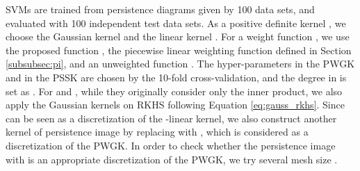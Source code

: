 \documentclass{article}
\begin{document}
SVMs are trained from persistence diagrams given by 100 data sets, and evaluated with 100 independent test data sets.  
As a positive definite kernel , we choose the Gaussian kernel  and the linear kernel .
For a weight function , we use the proposed function , the piecewise linear weighting function  defined in Section \ref{subsubsec:pi}, and an unweighted function .
The hyper-parameters  in the PWGK and  in the PSSK are chosen by the 10-fold cross-validation, and the degree  in  is set as .
For  and , while they originally consider only the inner product, we also apply the Gaussian kernels on RKHS following Equation \eqref{eq:gauss_rkhs}.
Since  can be seen as a discretization of the -linear kernel, we also construct another kernel of persistence image by replacing  with , which is considered as a discretization of the PWGK.
In order to check whether the persistence image with  is an appropriate discretization of the PWGK, we try several mesh size .
\end{document}
